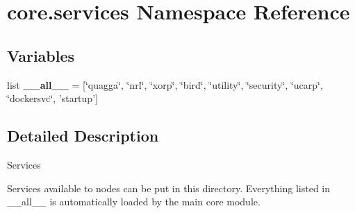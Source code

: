 \hypertarget{namespacecore_1_1services}{\section{core.\+services Namespace Reference}
\label{namespacecore_1_1services}
}
\subsection*{Variables}
\begin{DoxyCompactItemize}
\item 
\hypertarget{namespacecore_1_1services_afaef0ad2812bf88d7ee15ba19bc9bda8}{list {\bfseries \+\_\+\+\_\+all\+\_\+\+\_\+} = \mbox{[}\char`\"{}quagga\char`\"{}, \char`\"{}nrl\char`\"{}, \char`\"{}xorp\char`\"{}, \char`\"{}bird\char`\"{}, \char`\"{}utility\char`\"{}, \char`\"{}security\char`\"{}, \char`\"{}ucarp\char`\"{}, \char`\"{}dockersvc\char`\"{}, 'startup'\mbox{]}}\label{namespacecore_1_1services_afaef0ad2812bf88d7ee15ba19bc9bda8}

\end{DoxyCompactItemize}


\subsection{Detailed Description}
\begin{DoxyVerb}Services

Services available to nodes can be put in this directory.  Everything listed in
__all__ is automatically loaded by the main core module.
\end{DoxyVerb}
 